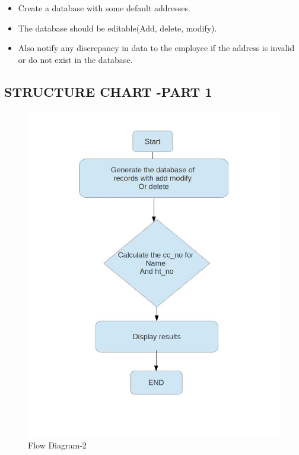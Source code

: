 \documentclass[11pt]{article}
\begin{document}
\begin{itemize}
\item Create a database with some default addresses.
\item The database should be editable(Add, delete, modify).
\item Also notify any discrepancy in data to the employee if the address is invalid or do not exist in the database.
\end{itemize}
\newpage
\begin{center}
\section{STRUCTURE CHART -PART 1}
\end{center}
\bigskip
\begin{figure}[h]
\includegraphics[scale=0.4]{structure2.jpg}
\centering
\caption{Flow Diagram-2}
\end{figure}
\newpage
\end{document}

